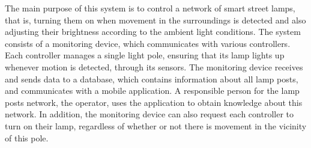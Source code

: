 The main purpose of this system is to control a network of smart street lamps, that is, turning them on when movement in the surroundings is detected and also adjusting their brightness according to the ambient light conditions. The system consists of a monitoring device, which communicates with various controllers. Each controller manages a single light pole, ensuring that its lamp lights up whenever motion is detected, through its sensors. The monitoring device receives and sends data to a database, which contains information about all lamp posts, and communicates with a mobile application. A responsible person for the lamp posts network, the operator, uses the application to obtain knowledge about this network. In addition, the monitoring device can also request each controller to turn on their lamp, regardless of whether or not there is movement in the vicinity of this pole.
